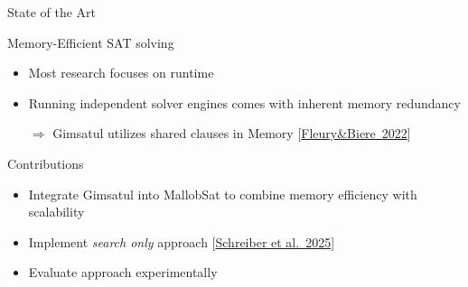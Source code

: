 \documentclass[]{sdqbeamer}
\begin{document}
\begin{frame}{State of the Art}
    \begin{block}{Memory-Efficient SAT solving}
        \begin{itemize}
            \item Most research focuses on runtime
            \item Running independent solver engines comes with inherent memory redundancy
            \item[$\Rightarrow$] Gimsatul utilizes shared clauses in Memory [\href{https://arxiv.org/pdf/2207.13577}{Fleury\&Biere~2022}]
        \end{itemize}
    \end{block}

    \begin{block}{Contributions}
        \begin{itemize}
            \item Integrate Gimsatul into MallobSat to combine memory efficiency with scalability
            \item Implement \textit{search only} approach [\href{https://satres.kikit.kit.edu/papers/2025-sat-streamlining-pre.pdf}{Schreiber et al.~2025}]
            \item Evaluate approach experimentally
        \end{itemize}
    \end{block}
\end{frame}
\end{document}
